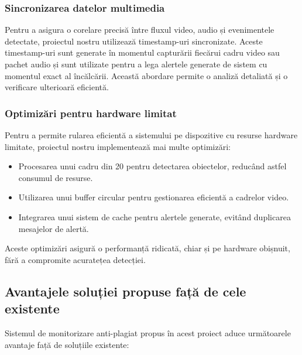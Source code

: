 \documentclass[12pt,a4paper]{article}
\begin{document}
\subsubsection{Sincronizarea datelor multimedia}
Pentru a asigura o corelare precisă între fluxul video, audio și evenimentele detectate, proiectul nostru utilizează timestamp-uri sincronizate. Aceste timestamp-uri sunt generate în momentul capturării fiecărui cadru video sau pachet audio și sunt utilizate pentru a lega alertele generate de sistem cu momentul exact al încălcării. Această abordare permite o analiză detaliată și o verificare ulterioară eficientă.

\subsubsection{Optimizări pentru hardware limitat}
Pentru a permite rularea eficientă a sistemului pe dispozitive cu resurse hardware limitate, proiectul nostru implementează mai multe optimizări:
\begin{itemize}
    \item Procesarea unui cadru din 20 pentru detectarea obiectelor, reducând astfel consumul de resurse.
    \item Utilizarea unui buffer circular pentru gestionarea eficientă a cadrelor video.
    \item Integrarea unui sistem de cache pentru alertele generate, evitând duplicarea mesajelor de alertă.
\end{itemize}
Aceste optimizări asigură o performanță ridicată, chiar și pe hardware obișnuit, fără a compromite acuratețea detecției.

\subsection{Avantajele soluției propuse față de cele existente}

Sistemul de monitorizare anti-plagiat propus în acest proiect aduce următoarele avantaje față de soluțiile existente:
\end{document}
